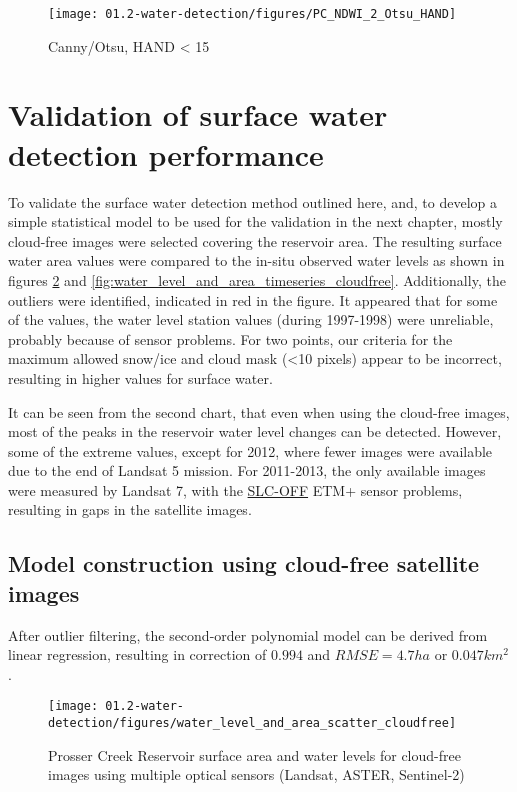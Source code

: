 \begin{figure}[H]
	\centering
	\texttt{[image: 01.2-water-detection/figures/PC\_NDWI\_2\_Otsu\_HAND]}
	\caption{Canny/Otsu, HAND < 15}
	\label{fig:r1_canny_otsu_hand}
\end{figure}

\section{Validation of surface water detection performance}

To validate the surface water detection method outlined here, and, to develop a simple statistical model to be used for the validation in the next chapter, mostly cloud-free images were selected covering the reservoir area. The resulting surface water area values were compared to the in-situ observed water levels as shown in figures \ref{fig:scatter_fit} and \ref{fig:water_level_and_area_timeseries_cloudfree}. Additionally, the outliers were identified, indicated in red in the figure. It appeared that for some of the values, the water level station values (during 1997-1998) were unreliable, probably because of sensor problems. For two points, our criteria for the maximum allowed snow/ice and cloud mask (<10 pixels) appear to be incorrect, resulting in higher values for surface water.

It can be seen from the second chart, that even when using the cloud-free images, most of the peaks in the reservoir water level changes can be detected. However, some of the extreme values, except for 2012, where fewer images were available due to the end of Landsat 5 mission. For 2011-2013, the only available images were measured by Landsat 7, with the \href{https://landsat.usgs.gov/slc-products-background}{SLC-OFF} ETM+ sensor problems, resulting in gaps in the satellite images.

\subsection{Model construction using cloud-free satellite images}

After outlier filtering, the second-order polynomial model can be derived from linear regression, resulting in correction of $0.994$ and $RMSE = 4.7ha$ or $0.047km^2$.

\begin{figure}[H]
	\centering
	\texttt{[image: 01.2-water-detection/figures/water\_level\_and\_area\_scatter\_cloudfree]}
	\caption{Prosser Creek Reservoir surface area and water levels for cloud-free images using multiple optical sensors (Landsat, ASTER, Sentinel-2)}
	\label{fig:scatter_fit}
\end{figure}

